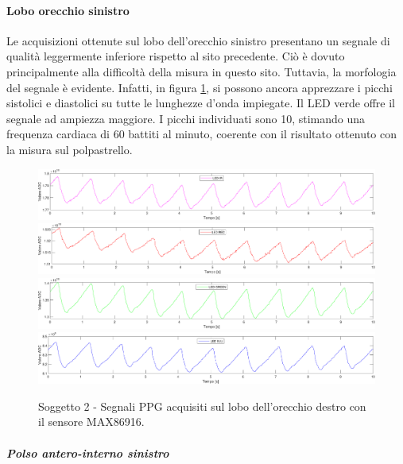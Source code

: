 \paragraph{Lobo orecchio sinistro}
Le acquisizioni ottenute sul lobo dell'orecchio sinistro presentano un segnale di qualità leggermente inferiore rispetto al sito precedente. Ciò è dovuto principalmente alla difficoltà della misura in questo sito. Tuttavia, la morfologia del segnale è evidente. Infatti, in figura \ref{fig:soggetto2_MAX86916_lobo}, si possono ancora apprezzare i picchi sistolici e diastolici su tutte le lunghezze d'onda impiegate. Il LED verde offre il segnale ad ampiezza maggiore. I picchi individuati sono 10, stimando una frequenza cardiaca di 60 battiti al minuto, coerente con il risultato ottenuto con la misura sul polpastrello.
\begin{figure}[h]
	\centering
	\includegraphics[width=1\linewidth]{ImageFiles/Misure Preliminari/Soggetto 2/max86916/lobo_ired}
	\includegraphics[width=1\linewidth]{ImageFiles/Misure Preliminari/Soggetto 2/max86916/lobo_red}
	\includegraphics[width=1\linewidth]{ImageFiles/Misure Preliminari/Soggetto 2/max86916/lobo_green}
	\includegraphics[width=1\linewidth]{ImageFiles/Misure Preliminari/Soggetto 2/max86916/lobo_blu}
	\caption{Soggetto 2 - Segnali PPG acquisiti sul lobo dell'orecchio destro con il sensore MAX86916.}
	\label{fig:soggetto2_MAX86916_lobo}
\end{figure}

\clearpage

\subparagraph{Polso antero-interno sinistro}

